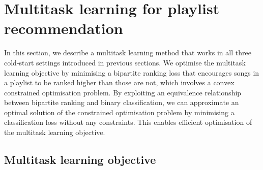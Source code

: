 \section{Multitask learning for playlist recommendation}
\label{sec:method}



In this section, 
we describe a multitask learning method that works in all three cold-start settings introduced in previous sections.
We optimise the multitask learning objective by minimising a bipartite ranking loss that encourages songs in a playlist
to be ranked higher than those are not, which involves a convex constrained optimisation problem.
By exploiting an equivalence relationship between bipartite ranking and binary classification, 
we can approximate an optimal solution of the constrained optimisation problem by minimising a classification loss without any constraints.
This enables efficient optimisation of the multitask learning objective.







\subsection{Multitask learning objective}

